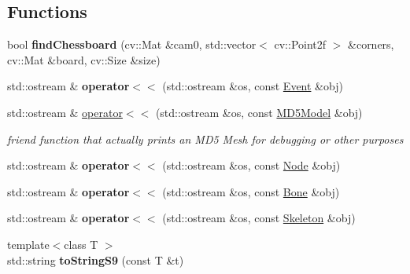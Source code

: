 \subsection*{Functions}
\begin{DoxyCompactItemize}
\item 
\hypertarget{namespaces9_a8b8b5ca9317d5e9a7026dc03d2fd1866}{bool {\bfseries find\-Chessboard} (cv\-::\-Mat \&cam0, std\-::vector$<$ cv\-::\-Point2f $>$ \&corners, cv\-::\-Mat \&board, cv\-::\-Size \&size)}\label{namespaces9_a8b8b5ca9317d5e9a7026dc03d2fd1866}

\item 
\hypertarget{namespaces9_ab92b827da3590481367cdc0160f7ffa3}{std\-::ostream \& {\bfseries operator$<$$<$} (std\-::ostream \&os, const \hyperlink{structs9_1_1Event}{Event} \&obj)}\label{namespaces9_ab92b827da3590481367cdc0160f7ffa3}

\item 
\hypertarget{namespaces9_a22238f71c73bc70713c0bc8575658fe0}{std\-::ostream \& \hyperlink{namespaces9_a22238f71c73bc70713c0bc8575658fe0}{operator$<$$<$} (std\-::ostream \&os, const \hyperlink{classs9_1_1MD5Model}{M\-D5\-Model} \&obj)}\label{namespaces9_a22238f71c73bc70713c0bc8575658fe0}

\begin{DoxyCompactList}\small\item\em friend function that actually prints an M\-D5 Mesh for debugging or other purposes \end{DoxyCompactList}\item 
\hypertarget{namespaces9_a4311eb92382fa0ebb25d71fc798b1787}{std\-::ostream \& {\bfseries operator$<$$<$} (std\-::ostream \&os, const \hyperlink{classs9_1_1Node}{Node} \&obj)}\label{namespaces9_a4311eb92382fa0ebb25d71fc798b1787}

\item 
\hypertarget{namespaces9_a7aa9ff947c7ee19298bdcfe04120cf18}{std\-::ostream \& {\bfseries operator$<$$<$} (std\-::ostream \&os, const \hyperlink{structs9_1_1Bone}{Bone} \&obj)}\label{namespaces9_a7aa9ff947c7ee19298bdcfe04120cf18}

\item 
\hypertarget{namespaces9_a9fcae181176ed7f71d77bb3231fdf72c}{std\-::ostream \& {\bfseries operator$<$$<$} (std\-::ostream \&os, const \hyperlink{classs9_1_1Skeleton}{Skeleton} \&obj)}\label{namespaces9_a9fcae181176ed7f71d77bb3231fdf72c}

\item 
\hypertarget{namespaces9_ae0355e1e3080fef4ecc00e2d56e68485}{{\footnotesize template$<$class T $>$ }\\std\-::string {\bfseries to\-String\-S9} (const T \&t)}\label{namespaces9_ae0355e1e3080fef4ecc00e2d56e68485}


\end{DoxyCompactItemize}
